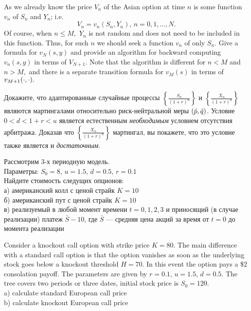 \begin{solution}
\begin{solution}
\begin{problem}
As we already know the price $V_n$ of the Asian option at time $n$
is some function $v_n$ of $S_n$ and $Y_n$; i.e.
\[
V_n=v_n(S_n,Y_n),\, n=0,1,\dots,N.
\]
\ni Of course, when $n\le M,$ $Y_n$ is not random and does not need to be included
in this function. Thus, for such $n$ we should seek a function $v_n$ of only $S_n$.
\ni Give a formula for $v_N(s,y)$ and provide an algorithm for backward computing
$v_n(s,y)$ in terms of $V_{N+1}.$ Note that the algorithm is different for $n<M$
and $n>M,$ and there is a separate transition formula for $v_M(s)$ in terms of
$v_{M+1}(\cdot,\cdot).$
\end{problem} 
\begin{solution} 

\end{solution}

\begin{problem}
 Докажите, что адаптированные случайные процессы $\left\{ \frac{S_n}{(1+r)^n}\right\}$ и
  $\left\{ \frac{X_n}{(1+r)^n}\right\}$ являются мартингалами относительно риск-нейтральной 
  меры $(\tilde p, \tilde q)$. Условие $0<d<1+r<u$ является естественным \emph{необходимым} условием 
  отсутствия арбитража. Доказав что $\left\{ \frac{X_n}{(1+r)^n}\right\}$ мартингал, вы покажете, 
  что это условие также является и \emph{достаточным}.
\end{problem} 
\begin{solution} 

\end{solution}

\begin{problem}
Рассмотрим 3-х периодную модель.\\
Параметры: $S_{0}=8$, $u=1.5$, $d=0.5$, $r=0.1$ \\
Найдите стоимость следущих опционов: \\
а) американский колл с ценой страйк $K=10$ \\
б) американский пут с ценой страйк $K=10$ \\
в) реализуемый в любой момент времени $t=0,1,2,3$ и приносящий (в случае реализации) платеж $\bar{S}-10$, где $\bar{S}$ --- средняя цена акций за время от $t=0$ до момента реализации 
\end{problem} 
\begin{solution} 

\end{solution}

\begin{problem}
 Consider a knockout call option with strike price $K=80$. The main difference with a standard call option is that the option vanishes as soon as the underlying stock goes below a knockout threshold $H=70$. In this event the option pays a \$2 consolation payoff. The parameters are given by $r=0.1$, $u=1.5$, $d=0.5$. The tree covers two periods or three dates, initial stock price is $S_{0}=120$. \\
a) calculate standard European call price \\
b) calculate knockout European call price 
\end{problem} 
\begin{solution} 
}




\end{solution}
\end{solution}
\end{solution}
